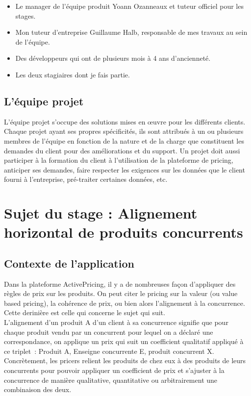 \documentclass{rapportCS}
\begin{document}
	\begin{itemize}
	\item{Le manager de l'équipe produit Yoann Ozanneaux et tuteur officiel pour les stages.}
	\item{Mon tuteur d'entreprise Guillaume Halb, responsable de mes travaux au sein de l'équipe.}
	\item{Des développeurs qui ont de plusieurs mois à 4 ans d'ancienneté.}
	\item{Les deux stagiaires dont je fais partie.}
	\end{itemize}

\subsection{L'équipe projet}
	L'équipe projet s'occupe des solutions mises en œuvre pour les différents clients.
	Chaque projet ayant ses propres spécificités, ils sont attribués à un ou plusieurs membres
	de l'équipe en fonction de la nature et de la charge que constituent les demandes du 
	client pour des améliorations et du support. Un projet doit aussi participer à la formation
	du client à l'utilisation de la plateforme de pricing, anticiper ses demandes, faire respecter
	les exigences sur les données que le client fourni à l'entreprise, pré-traiter certaines données,
	etc.

\newpage

\section{Sujet du stage : Alignement horizontal de produits concurrents}

\subsection{Contexte de l'application}
Dans la plateforme ActivePricing, il y a de nombreuses façon d'appliquer des règles de prix sur les 
produits. On peut citer le pricing sur la valeur (ou value based pricing), la cohérence de prix,
ou bien alors l'alignement à la concurrence. Cette derinière est celle qui concerne le sujet qui suit.\\

L'alignement d'un produit A d'un client à sa concurrence signifie que pour chaque produit vendu par un
concurrent pour lequel on a déclaré une correspondance, on applique un prix qui suit un coefficient
qualitatif appliqué à ce triplet : Produit A, Enseigne concurrente E, produit concurrent X.
Concrètement, les pricers relient les produits de chez eux à des produits de leurs concurrents 
pour pouvoir appliquer un coefficient de prix et s'ajuster à la concurrence de manière qualitative,
quantitative ou arbitrairement une combinaison des deux. \\
\end{document}
